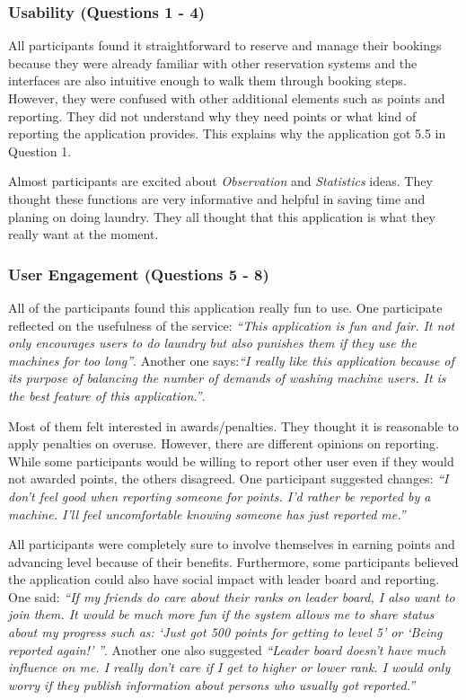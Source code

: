 \subsubsection{Usability (Questions 1 - 4)}
All participants found it straightforward to reserve and manage their bookings because they were already familiar with other reservation systems and the interfaces are also intuitive enough to walk them through booking steps. However, they were confused with other additional elements such as points and reporting. They did not understand why they need points or what kind of reporting the application provides. This explains why the application got 5.5 in Question 1.

Almost participants are excited about \emph{Observation} and \emph{Statistics} ideas. They thought these functions are very informative and helpful in saving time and planing on doing laundry. They all thought that this application is what they really want at the moment. 
\subsubsection{User Engagement (Questions 5 - 8)}
All of the participants found this application really fun to use. One participate reflected on the usefulness of the service: \textit{``This application is fun and fair. It not only encourages users to do laundry but also punishes them if they use the machines for too long''}. Another one says:\textit{``I really like this application because of its purpose of balancing the number of demands of washing machine users. It is the best feature of this application.''}.

Most of them felt interested in awards/penalties. They thought it is reasonable to apply penalties on overuse. However, there are different opinions on reporting. While some participants would be willing to report other user even if they would not awarded points, the others disagreed. One participant suggested changes: \textit{``I don't feel good when reporting someone for points. I'd rather be reported by a machine. I'll feel uncomfortable knowing someone has just reported me.''} 

All participants were completely sure to involve themselves in earning points and advancing level because of their benefits. Furthermore, some participants believed the application could also have social impact with leader board and reporting. One said: \textit{``If my friends do care about their ranks on leader board, I also want to join them. It would be much more fun if the system allows me to share status about my progress such as: `Just got 500 points for getting to level 5' or `Being reported again!' ''}. Another one also suggested \textit{``Leader board doesn't have much influence on me. I really don't care if I get to higher or lower rank. I would only worry if they publish information about persons who usually got reported.''}
